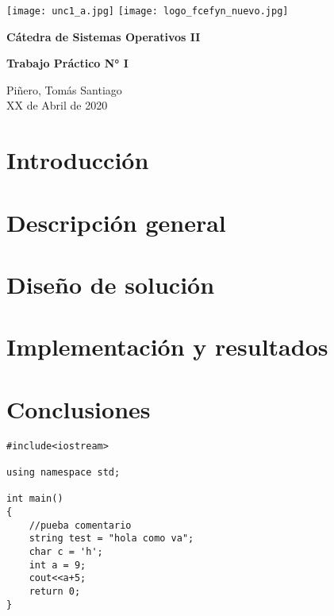\documentclass[12pt,a4paper]{article}
\renewcommand{\baselinestretch}{1} %
\begin{document}
\begin{titlepage}
    \begin{center}
      \vspace*{1cm}

      \vspace{2cm}
      \texttt{[image: unc1\_a.jpg]}
      \texttt{[image: logo\_fcefyn\_nuevo.jpg]}

      \Huge
      \textbf{Cátedra de Sistemas Operativos II}

      \vspace{3.5cm}

      \textbf{Trabajo Práctico N\si{\degree} I}

      \vfill

      \vspace{0.8cm}



      \Large
      Piñero, Tomás Santiago\\
      XX de Abril de 2020
    \end{center}
\end{titlepage}

\setcounter{secnumdepth}{1}
\setcounter{tocdepth}{5}
\tableofcontents


\newpage
\renewcommand{\baselinestretch}{1}
\setlength{\parskip}{0.5em}

\section{Introducción}

\section{Descripción general}

\section{Diseño de solución}

\section{Implementación y resultados}

\section{Conclusiones}

\begin{lstlisting}[caption={Prueba Ce language.}, language=Ce]
#include<iostream>

using namespace std;

int main()
{
	//pueba comentario
	string test = "hola como va";
	char c = 'h';
	int a = 9;
	cout<<a+5;
	return 0;
}
\end{lstlisting}
\end{document}
